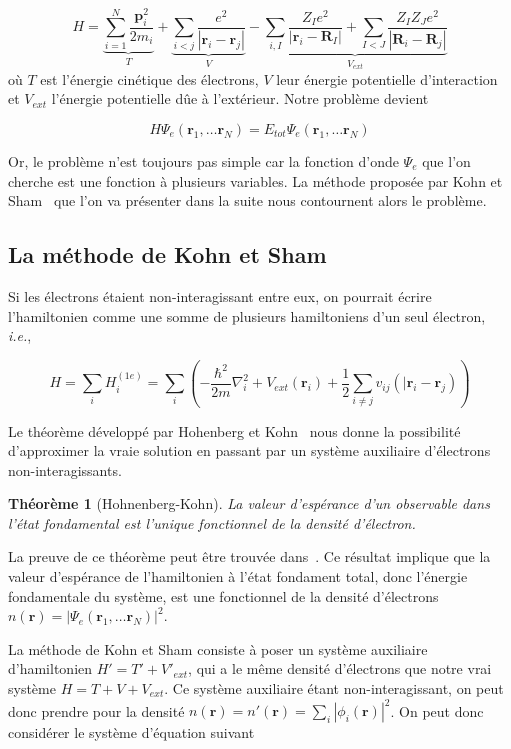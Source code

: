 \documentclass[12pt, french]{report}
\theoremstyle{theoreme}
\newtheorem{theoreme}{Théorème}
\begin{document}
$$
H = \underbrace{\sum_{i=1}^N \frac{\textbf{p}_i^2}{2m_i}}_{T}
+ \underbrace{\sum_{i<j}\frac{e^2}{| \textbf{r}_i - \textbf{r}_j |}}_{V}
- \underbrace{\sum_{i, I}\frac{Z_I e^2}{| \textbf{r}_i - \textbf{R}_I |} + \sum_{I<J}\frac{Z_I Z_J e^2}{| \textbf{R}_i - \textbf{R}_j |}}_{V_{ext}}
$$
où $T$ est l'énergie cinétique des électrons, $V$ leur énergie potentielle d'interaction et $V_{ext}$ l'énergie potentielle dûe à l'extérieur.
Notre problème devient

$$
H \Psi_e(\textbf{r}_1, \ldots \textbf{r}_N) = E_{tot} \Psi_e(\textbf{r}_1, \ldots \textbf{r}_N)
$$

Or, le problème n'est toujours pas simple car la fonction d'onde $\Psi_e$ que l'on cherche est une fonction à plusieurs variables. La méthode proposée par Kohn et Sham~\cite{Koh65} que l'on va présenter dans la suite nous contournent alors le problème.

\subsection{La méthode de Kohn et Sham}
Si les électrons étaient non-interagissant entre eux, on pourrait écrire l'hamiltonien comme une somme de plusieurs hamiltoniens d'un seul électron, \textit{i.e.},

$$
H = \sum_i H_i^{(1e)} = \sum_i (-\frac{\hbar^2}{2m}\nabla_i^2 + V_{ext}(\textbf{r}_i) + \frac{1}{2}\sum_{i \neq j} v_{ij}(|\textbf{r}_i - \textbf{r}_j))
$$

Le théorème développé par Hohenberg et Kohn~\cite{Hoh64} nous donne la possibilité d'approximer la vraie solution en passant par un système auxiliaire d'électrons non-interagissants.

\begin{theoreme}[Hohnenberg-Kohn]
  La valeur d'espérance d'un observable dans l'état fondamental est l'unique fonctionnel de la densité d'électron.
\end{theoreme}

La preuve de ce théorème peut être trouvée dans~\cite{Sot03}.
Ce résultat implique que la valeur d'espérance de l'hamiltonien à l'état fondament total, donc l'énergie fondamentale du système, est une fonctionnel de la densité d'électrons $n(\textbf{r}) = |\Psi_e(\textbf{r}_1, \ldots \textbf{r}_N) |^2$.

La méthode de Kohn et Sham consiste à poser un système auxiliaire d'hamiltonien $H' = T' + V'_{ext}$, qui a le même densité d'électrons que notre vrai système $H = T + V + V_{ext}$. Ce système auxiliaire étant non-interagissant, on peut donc prendre pour la densité $n(\textbf{r}) = n'(\textbf{r}) = \sum_i |\phi_i(\textbf{r})|^2$. On peut donc considérer le système d'équation suivant
\end{document}

